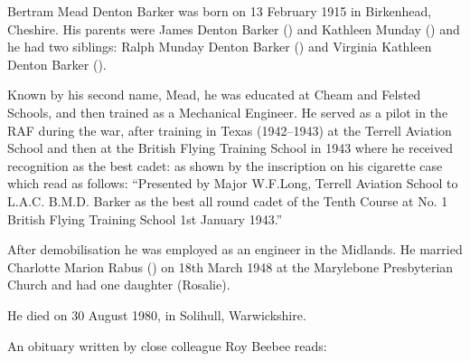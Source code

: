 
Bertram Mead Denton Barker was born on 13 February 1915 in Birkenhead, Cheshire.  His parents were James Denton Barker () and Kathleen Munday () and he had two siblings: Ralph Munday Denton Barker () and Virginia Kathleen Denton Barker ().

Known by his second name, Mead, he was educated at Cheam and Felsted Schools, and then trained as a Mechanical Engineer. He served as a pilot in the RAF during the war,  after training in Texas (1942--1943) at the Terrell Aviation School and then at the British Flying Training School in 1943 where he  received recognition as the best cadet:  as shown by the inscription on his cigarette case which read as follows: ``Presented by Major W.F.Long, Terrell Aviation School to L.A.C. B.M.D. Barker as the best all round cadet of the Tenth Course at No. 1 British Flying Training School 1st January 1943.''

After demobilisation he was employed as an engineer in the Midlands. He married Charlotte Marion Rabus () on 18th March 1948 at the Marylebone Presbyterian Church \cite{TheTimes1948-03-22} and had one daughter (Rosalie).

He died on 30 August 1980, in Solihull, Warwickshire. 

An obituary written by close colleague Roy Beebee reads:

